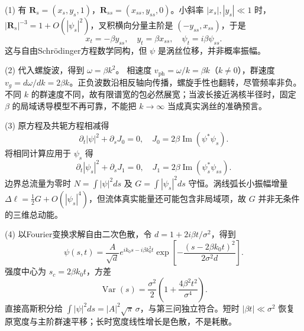 (1) 有 \(\mathbf R_s=(x_s,y_s,1)\)，\(\mathbf R_{ss}=(x_{ss},y_{ss},0)\)。小斜率 \(|x_s|,|y_s|\ll1\) 时，
\(|\mathbf R_s|^{-3}=1+O(|\psi_s|^2)\)，叉积横向分量主阶是 \((-y_{ss},x_{ss})\)，于是
\[
x_t=-\beta y_{ss},\quad y_t=\beta x_{ss},\quad
\boxed{\psi_t=i\beta\psi_{ss}}.
\]
这与自由Schrödinger方程数学同构，但 \(\psi\) 是涡丝位移，并非概率振幅。

(2) 代入螺旋波，得到 \(\omega=\beta k^2\)。
相速度 \(v_{\mathrm{ph}}=\omega/k=\beta k\)（\(k\ne0\)），群速度
\(v_g=d\omega/dk=2\beta k\)。正负波数沿相反轴向传播，螺旋手性也翻转，尽管频率非负。不同 \(k\) 的群速度不同，故有限谱宽的包必然展宽；当波长接近涡核半径时，固定 \(\beta\) 的局域诱导模型不再可靠，不能把 \(k\to\infty\) 当成真实涡丝的准确预言。

(3) 原方程及共轭方程相减得
\[
\partial_t|\psi|^2+\partial_s J_0=0,\quad
J_0=2\beta\operatorname{Im}(\psi^*\psi_s).
\]
将相同计算应用于 \(\psi_s\) 得
\[
\partial_t|\psi_s|^2+\partial_s J_1=0,\quad
J_1=2\beta\operatorname{Im}(\psi_s^*\psi_{ss}).
\]
边界总流量为零时 \(N=\int|\psi|^2ds\) 及
\(G=\int|\psi_s|^2ds\) 守恒。涡线弧长小振幅增量
\(\Delta\ell=\frac12G+O(|\psi_s|^4)\)，但流体真实能量还可能包含非局域项，故 \(G\) 并非无条件的三维总动能。

(4) 以Fourier变换求解自由二次色散，令 \(d=1+2i\beta t/\sigma^2\)，得到
\[
\psi(s,t)=\frac{A}{\sqrt d}
e^{ik_0s-i\beta k_0^2t}
\exp\left[-\frac{(s-2\beta k_0t)^2}{2\sigma^2d}\right].
\]
强度中心为 \(s_c=2\beta k_0t\)，方差
\[
\operatorname{Var}(s)=\frac{\sigma^2}{2}
\left(1+\frac{4\beta^2t^2}{\sigma^4}\right).
\]
直接高斯积分给 \(\int|\psi|^2ds=|A|^2\sqrt\pi\,\sigma\)，与第三问独立符合。短时 \(|\beta t|\ll\sigma^2\) 恢复原宽度与主阶群速平移；长时宽度线性增长是色散，不是耗散。
